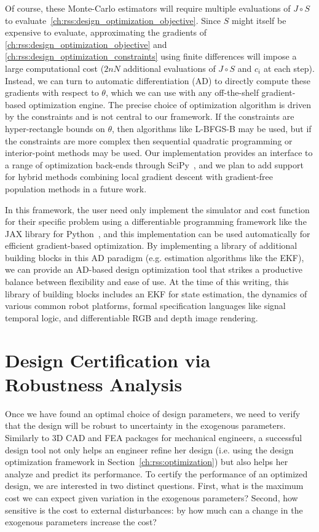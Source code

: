 Of course, these Monte-Carlo estimators will require multiple evaluations of $J\circ S$ to evaluate~\eqref{ch:rss:design_optimization_objective}. Since $S$ might itself be expensive to evaluate, approximating the gradients of \eqref{ch:rss:design_optimization_objective} and \eqref{ch:rss:design_optimization_constraints} using finite differences will impose a large computational cost ($2nN$ additional evaluations of $J\circ S$ and $c_i$ at each step). Instead, we can turn to automatic differentiation (AD) to directly compute these gradients with respect to $\theta$, which we can use with any off-the-shelf gradient-based optimization engine. The precise choice of optimization algorithm is driven by the constraints and is not central to our framework. If the constraints are hyper-rectangle bounds on $\theta$, then algorithms like L-BFGS-B may be used, but if the constraints are more complex then sequential quadratic programming or interior-point methods may be used. Our implementation provides an interface to a range of optimization back-ends through SciPy~\cite{2020SciPy-NMeth}, and we plan to add support for hybrid methods combining local gradient descent with gradient-free population methods in a future work.

In this framework, the user need only implement the simulator and cost function for their specific problem using a differentiable programming framework like the JAX library for Python~\cite{jax2018github}, and this implementation can be used automatically for efficient gradient-based optimization. By implementing a library of additional building blocks in this AD paradigm (e.g. estimation algorithms like the EKF), we can provide an AD-based design optimization tool that strikes a productive balance between flexibility and ease of use. At the time of this writing, this library of building blocks includes an EKF for state estimation, the dynamics of various common robot platforms, formal specification languages like signal temporal logic, and differentiable RGB and depth image rendering.

\section{Design Certification via Robustness Analysis}\label{ch:rss:analysis}

Once we have found an optimal choice of design parameters, we need to verify that the design will be robust to uncertainty in the exogenous parameters. Similarly to 3D CAD and FEA packages for mechanical engineers, a successful design tool not only helps an engineer refine her design (i.e. using the design optimization framework in Section~\ref{ch:rss:optimization}) but also helps her analyze and predict its performance. To certify the performance of an optimized design, we are interested in two distinct questions. First, what is the maximum cost we can expect given variation in the exogenous parameters? Second, how sensitive is the cost to external disturbances: by how much can a change in the exogenous parameters increase the cost?


